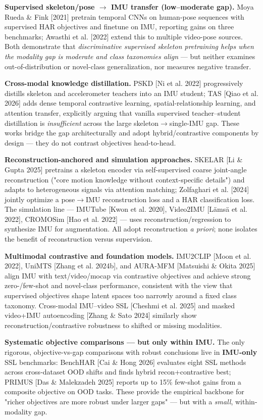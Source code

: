 \textbf{Supervised skeleton/pose $\rightarrow$ IMU transfer (low--moderate gap).} Moya Rueda \& Fink [2021] pretrain temporal CNNs on human-pose sequences with supervised HAR objectives and finetune on IMU, reporting gains on three benchmarks; Awasthi et al. [2022] extend this to multiple video-pose sources. Both demonstrate that \textit{discriminative supervised skeleton pretraining helps when the modality gap is moderate and class taxonomies align} --- but neither examines out-of-distribution or novel-class generalization, nor measures negative transfer.

\textbf{Cross-modal knowledge distillation.} PSKD [Ni et al. 2022] progressively distills skeleton and accelerometer teachers into an IMU student; TAS [Qiao et al. 2026] adds dense temporal contrastive learning, spatial-relationship learning, and attention transfer, explicitly arguing that vanilla supervised teacher--student distillation is \textit{insufficient} across the large skeleton$\rightarrow$single-IMU gap. These works bridge the gap architecturally and adopt hybrid/contrastive components by design --- they do not contrast objectives head-to-head.

\textbf{Reconstruction-anchored and simulation approaches.} SKELAR [Li \& Gupta 2025] pretrains a skeleton encoder via self-supervised coarse joint-angle reconstruction ("core motion knowledge without context-specific details") and adapts to heterogeneous signals via attention matching; Zolfaghari et al. [2024] jointly optimize a pose$\rightarrow$IMU reconstruction loss and a HAR classification loss. The simulation line --- IMUTube [Kwon et al. 2020], Video2IMU [Lämsä et al. 2022], CROMOSim [Hao et al. 2022] --- uses reconstruction/regression to synthesize IMU for augmentation. All adopt reconstruction \textit{a priori}; none isolates the benefit of reconstruction versus supervision.

\textbf{Multimodal contrastive and foundation models.} IMU2CLIP [Moon et al. 2022], UniMTS [Zhang et al. 2024b], and AURA-MFM [Matsuishi \& Okita 2025] align IMU with text/video/mocap via contrastive objectives and achieve strong zero-/few-shot and novel-class performance, consistent with the view that supervised objectives shape latent spaces too narrowly around a fixed class taxonomy. Cross-modal IMU--video SSL [Cheshmi et al. 2025] and masked video+IMU autoencoding [Zhang \& Sato 2024] similarly show reconstruction/contrastive robustness to shifted or missing modalities.

\textbf{Systematic objective comparisons --- but only within IMU.} The only rigorous, objective-vs-gap comparisons with robust conclusions live in \textbf{IMU-only} SSL benchmarks: BenchHAR [Cai \& Hong 2026] evaluates eight SSL methods across cross-dataset OOD shifts and finds hybrid recon+contrastive best; PRIMUS [Das \& Malekzadeh 2025] reports up to 15\% few-shot gains from a composite objective on OOD tasks. These provide the empirical backbone for "richer objectives are more robust under larger gaps" --- but with a \textit{small}, within-modality gap.

